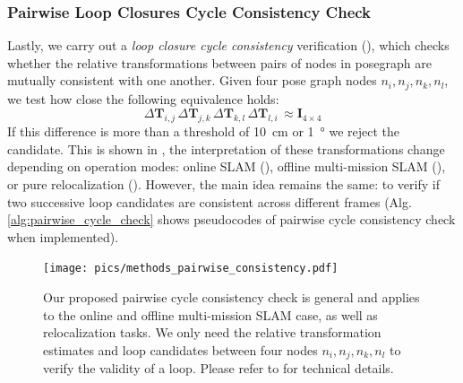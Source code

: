 \subsubsection*{\textbf{Pairwise Loop Closures Cycle Consistency Check}}
Lastly, we carry out a \emph{loop closure cycle consistency} verification (), which checks whether the relative transformations between pairs of nodes in posegraph are mutually consistent with one another. Given four pose graph nodes $n_i, n_j, n_k, n_l$, we test how close the following equivalence holds:
\begin{equation}
\Delta\mathbf{T}_{i,j}\, \Delta\mathbf{T}_{j,k}\, \Delta\mathbf{T}_{k,l}\, \Delta\mathbf{T}_{l,i}\, \approx \mathbf{I}_{4\times4} 
\end{equation}
If this difference is more than a threshold of \SI{10}{\centi\meter} or \SI{1}{\degree} we reject the candidate. This is shown in , the interpretation of these transformations change depending on operation modes: online SLAM (), offline multi-mission SLAM (), or pure relocalization (). However, the main idea remains the same: to verify if two successive loop candidates are consistent across different frames (Alg.\ref{alg:pairwise_cycle_check} shows pseudocodes of pairwise cycle consistency check when implemented).
\begin{figure}[t]
  \centering
  \texttt{[image: pics/methods\_pairwise\_consistency.pdf]}
  \caption{Our proposed pairwise cycle consistency check is general and applies to the online and offline multi-mission SLAM case, as well as relocalization tasks. We only need the relative transformation estimates and loop candidates between four nodes $n_i, n_j, n_k, n_l$ to verify the validity of a loop. Please refer to  for technical details.}
  \label{fig:cycle-consistency}
\end{figure}

